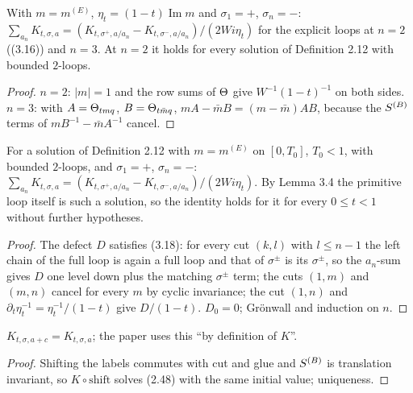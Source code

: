 \begin{lemma}[Ward identity for $\Kcal$ at $n=2,3$, Lemma 3.6 Step 1]\label{lem:3.6-small}
  \leanok
  With $m=m^{(E)}$, $\eta_t=(1-t)\operatorname{Im}m$ and $\sigma_1=+$, $\sigma_n=-$:
  $\sum_{a_n}K_{t,\sigma,a}=(K_{t,\sigma^+,a/a_n}-K_{t,\sigma^-,a/a_n})/(2Wi\eta_t)$ for the
  explicit loops at $n=2$ ((3.16)) and $n=3$.  At $n=2$ it holds for every solution of
  Definition 2.12 with bounded $2$-loops.
\end{lemma}
\begin{proof}\leanok{}
  $n=2$: $|m|=1$ and the row sums of $\Theta$ give $W^{-1}(1-t)^{-1}$ on both sides.
  $n=3$: with $A=\Theta_{tmq}$, $B=\Theta_{t\bar mq}$, $mA-\bar mB=(m-\bar m)AB$, because the
  $S^{(B)}$ terms of $mB^{-1}-\bar mA^{-1}$ cancel.
\end{proof}

\begin{lemma}\label{lem:3.6}
  \leanok
  For a solution of Definition 2.12 with $m=m^{(E)}$ on $[0,T_0]$, $T_0<1$, with bounded
  $2$-loops, and $\sigma_1=+$, $\sigma_n=-$:
  $\sum_{a_n}K_{t,\sigma,a}=(K_{t,\sigma^+,a/a_n}-K_{t,\sigma^-,a/a_n})/(2Wi\eta_t)$.
  By Lemma 3.4 the primitive loop itself is such a solution, so the identity holds for it for
  every $0\le t<1$ without further hypotheses.
\end{lemma}
\begin{proof}\leanok
  The defect $D$ satisfies (3.18): for every cut $(k,l)$ with $l\le n-1$ the left chain of the
  full loop is again a full loop and that of $\sigma^\pm$ is its $\sigma^\pm$, so the
  $a_n$-sum gives $D$ one level down plus the matching $\sigma^\pm$ term; the cuts $(1,m)$ and
  $(m,n)$ cancel for every $m$ by cyclic invariance; the cut $(1,n)$ and
  $\partial_t\eta_t^{-1}=\eta_t^{-1}/(1-t)$ give $D/(1-t)$.  $D_0=0$; Gr\"onwall and induction
  on $n$.
\end{proof}

\begin{lemma}\label{lem:K-shift}
  \leanok
  $K_{t,\sigma,a+c}=K_{t,\sigma,a}$; the paper uses this ``by definition of $K$''.
\end{lemma}
\begin{proof}\leanok{}
  Shifting the labels commutes with cut and glue and $S^{(B)}$ is translation invariant, so
  $K\circ\mathrm{shift}$ solves (2.48) with the same initial value; uniqueness.
\end{proof}

